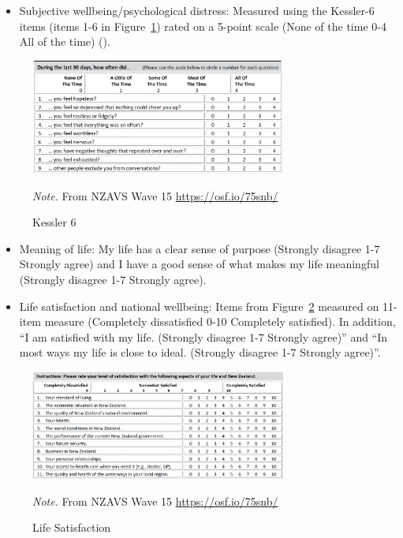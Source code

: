 \documentclass[
  man,
  longtable,
  nolmodern,
  notxfonts,
  notimes,
  colorlinks=true,linkcolor=blue,citecolor=blue,urlcolor=blue]{apa7}
\providecommand{\tightlist}{%
  \setlength{\itemsep}{0pt}\setlength{\parskip}{0pt}}
\begin{document}
\begin{itemize}
\tightlist
\item
  Subjective wellbeing/psychological distress: Measured using the
  Kessler-6 items (items 1-6 in Figure~\ref{fig-Kess-6}) rated on a
  5-point scale (None of the time 0-4 All of the time)
  ().
\end{itemize}

\begin{figure}[!htbp]

{\caption{{Kessler 6}{\label{fig-Kess-6}}}}

\includegraphics[width=0.75\textwidth,height=\textheight]{figs/kessler-6.png}

{\noindent \emph{Note.} From NZAVS Wave 15 \url{https://osf.io/75snb/}}

\end{figure}

\begin{itemize}
\item
  Meaning of life: My life has a clear sense of purpose (Strongly
  disagree 1-7 Strongly agree) and I have a good sense of what makes my
  life meaningful (Strongly disagree 1-7 Strongly agree).
\item
  Life satisfaction and national wellbeing: Items from
  Figure~\ref{fig-life-sat} measured on 11-item measure (Completely
  dissatisfied 0-10 Completely satisfied). In addition, ``I am satisfied
  with my life. (Strongly disagree 1-7 Strongly agree)'' and ``In most
  ways my life is close to ideal. (Strongly disagree 1-7 Strongly
  agree)''.
\end{itemize}

\begin{figure}[!htbp]

{\caption{{Life Satisfaction}{\label{fig-life-sat}}}}

\includegraphics[width=0.75\textwidth,height=\textheight]{figs/life-sat.png}

{\noindent \emph{Note.} From NZAVS Wave 15 \url{https://osf.io/75snb/}}

\end{figure}
\end{document}
